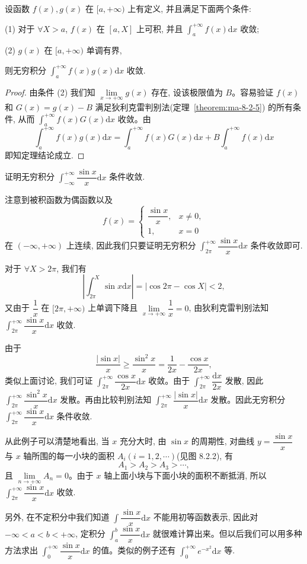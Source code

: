 \begin{theorem}[{阿贝尔判别法}]\label{theorem:ma-8-2-6}
设函数 $f(x),g(x)$ 在 $[a,+\infty)$ 上有定义, 并且满足下面两个条件:

(1) 对于 $\forall X>a$, $f(x)$ 在 $[a,X]$ 上可积, 并且 $\int_a^{+\infty}f(x)\mathrm dx$ 收敛;

(2) $g(x)$ 在 $[a,+\infty)$ 单调有界,

则无穷积分 $\int_a^{+\infty}f(x)g(x)\mathrm dx$ 收敛.
\end{theorem}


\begin{proof}
由条件 (2) 我们知 $\lim\limits_{x\to+\infty}g(x)$ 存在, 设该极限值为 $B$。容易验证 $f(x)$ 和 $G(x)=g(x)-B$ 满足狄利克雷判别法(定理~\ref{theorem:ma-8-2-5}) 的所有条件, 从而 $\int_a^{+\infty}f(x)G(x)\mathrm dx$ 收敛。由
\[
  \int_a^{+\infty}f(x)g(x)\mathrm dx
  =
  \int_a^{+\infty}f(x)G(x)\mathrm dx
  +
  B\int_a^{+\infty}f(x)\mathrm dx
\]
即知定理结论成立.
\end{proof}


\begin{example}\label{example:ma-8-2-5}
证明无穷积分 $\int_{-\infty}^{+\infty}\dfrac{\sin x}{x}\mathrm dx$ 条件收敛.
\end{example}


\begin{solve}
注意到被积函数为偶函数以及
\[
  f(x)=
  \begin{cases}
    \dfrac{\sin x}{x}, & x\ne0,\\
    1, & x=0
  \end{cases}
\]
在 $(-\infty,+\infty)$ 上连续, 因此我们只要证明无穷积分 $\int_{2\pi}^{+\infty}\dfrac{\sin x}{x}\mathrm dx$ 条件收敛即可.

对于 $\forall X>2\pi$, 我们有
\[
  \left|\int_{2\pi}^X\sin x\mathrm dx\right|
  =
  |\cos2\pi-\cos X|<2,
\]
又由于 $\dfrac1x$ 在 $[2\pi,+\infty)$ 上单调下降且 $\lim\limits_{x\to+\infty}\dfrac1x=0$, 由狄利克雷判别法知 $\int_{2\pi}^{+\infty}\dfrac{\sin x}{x}\mathrm dx$ 收敛.

由于
\[
  \frac{|\sin x|}{x}\geq \frac{\sin^2x}{x}=\frac1{2x}-\frac{\cos x}{2x},
\]
类似上面讨论, 我们可证 $\int_{2\pi}^{+\infty}\dfrac{\cos x}{2x}\mathrm dx$ 收敛。由于 $\int_{2\pi}^{+\infty}\dfrac{\mathrm dx}{2x}$ 发散, 因此 $\int_{2\pi}^{+\infty}\dfrac{\sin^2x}{x}\mathrm dx$ 发散。再由比较判别法知 $\int_{2\pi}^{+\infty}\dfrac{|\sin x|}{x}\mathrm dx$ 发散。因此无穷积分 $\int_{2\pi}^{+\infty}\dfrac{\sin x}{x}\mathrm dx$ 条件收敛.

从此例子可以清楚地看出, 当 $x$ 充分大时, 由 $\sin x$ 的周期性, 对曲线 $y=\dfrac{\sin x}{x}$ 与 $x$ 轴所围的每一小块的面积 $A_i(i=1,2,\cdots)$(见图 8.2.2), 有
\[
  A_1>A_2>A_3>\cdots,
\]
且 $\lim\limits_{n\to+\infty}A_n=0$。由于 $x$ 轴上面小块与下面小块的面积不断抵消, 所以 $\int_{2\pi}^{+\infty}\dfrac{\sin x}{x}\mathrm dx$ 收敛.

另外, 在不定积分中我们知道 $\int\dfrac{\sin x}{x}\mathrm dx$ 不能用初等函数表示, 因此对 $-\infty<a<b<+\infty$, 定积分 $\int_a^b\dfrac{\sin x}{x}\mathrm dx$ 就很难计算出来。但以后我们可以用多种方法求出 $\int_0^{+\infty}\dfrac{\sin x}{x}\mathrm dx$ 的值。类似的例子还有 $\int_0^{+\infty}e^{-x^2}\mathrm dx$ 等.
\end{solve}


